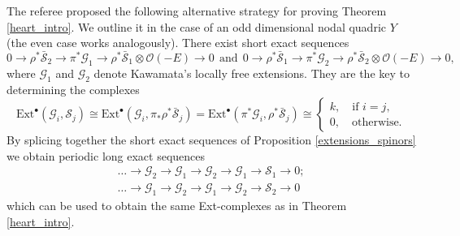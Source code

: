 \documentclass[a4paper, twoside, 11pt]{amsart}
\theoremstyle{definition}
\theoremstyle{remark}
\numberwithin{equation}{theorem}
\begin{document}
The referee proposed the following alternative strategy for proving Theorem \ref{heart_intro}. We outline it in the case of an odd dimensional nodal quadric $Y$ (the even case works analogously). There exist short exact sequences 
    \begin{equation*}
        0 \to \rho^*\bar{\mathcal{S}}_2 \to \pi^*\mathcal{G}_1 \to \rho^*\bar{\mathcal{S}}_1 \otimes \mathcal{O}(-E) \to 0 \ \ \text{and} 
        \ \ 0 \to \rho^*\bar{\mathcal{S}}_1 \to \pi^*\mathcal{G}_2 \to \rho^*\bar{\mathcal{S}}_2 \otimes \mathcal{O}(-E) \to 0, 
    \end{equation*}
    where $\mathcal{G}_1$ and $\mathcal{G}_2$ denote Kawamata's locally free extensions. They are the key to determining the complexes 
    \begin{equation*}
        \mathrm{Ext}^{\bullet}(\mathcal{G}_i, \mathcal{S}_j) \cong \mathrm{Ext}^{\bullet}(\mathcal{G}_i, \pi_*\rho^*\bar{\mathcal{S}}_j) = \mathrm{Ext}^{\bullet}(\pi^*\mathcal{G}_i, \rho^*\bar{\mathcal{S}}_j) \cong \begin{cases}
        k, \quad \text{if } i =j, \\
        0, \quad \text{otherwise.}
        \end{cases}
    \end{equation*}
    By splicing together the short exact sequences of Proposition \ref{extensions_spinors} we obtain periodic long exact sequences 
    \begin{equation*}
    \begin{aligned}
        \dots \to \mathcal{G}_2 \to \mathcal{G}_1 \to \mathcal{G}_2 \to \mathcal{G}_1 \to \mathcal{S}_1 \to 0; \\
        \dots \to \mathcal{G}_1 \to \mathcal{G}_2 \to \mathcal{G}_1 \to \mathcal{G}_2 \to \mathcal{S}_2 \to 0
    \end{aligned}
    \end{equation*}
    which can be used to obtain the same Ext-complexes as in Theorem \ref{heart_intro}.  
\end{document}

